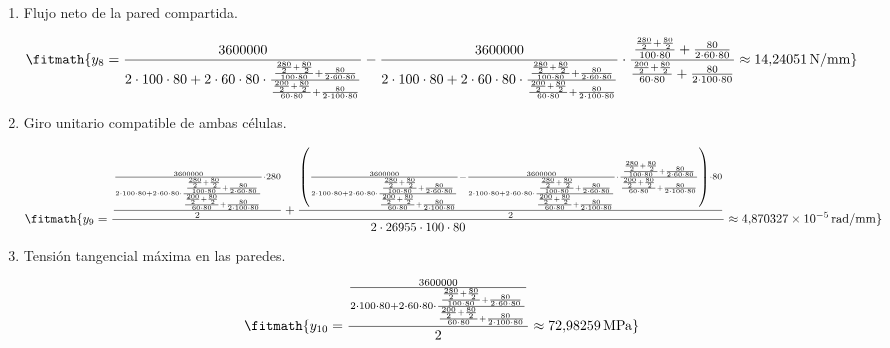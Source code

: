 \begin{enumerate}
\item Flujo neto de la pared compartida.

\[\fitmath{y_{8}=\frac{3600000}{2\cdot 100\cdot 80+2\cdot 60\cdot 80\cdot \frac{\frac{\frac{280}{2}+\frac{80}{2}}{100\cdot 80}+\frac{80}{2\cdot 60\cdot 80}}{\frac{\frac{200}{2}+\frac{80}{2}}{60\cdot 80}+\frac{80}{2\cdot 100\cdot 80}}}-\frac{3600000}{2\cdot 100\cdot 80+2\cdot 60\cdot 80\cdot \frac{\frac{\frac{280}{2}+\frac{80}{2}}{100\cdot 80}+\frac{80}{2\cdot 60\cdot 80}}{\frac{\frac{200}{2}+\frac{80}{2}}{60\cdot 80}+\frac{80}{2\cdot 100\cdot 80}}}\cdot \frac{\frac{\frac{280}{2}+\frac{80}{2}}{100\cdot 80}+\frac{80}{2\cdot 60\cdot 80}}{\frac{\frac{200}{2}+\frac{80}{2}}{60\cdot 80}+\frac{80}{2\cdot 100\cdot 80}}\approx 14{,}24051\,\mathrm{N/mm}}\]

\item Giro unitario compatible de ambas células.

\[\fitmath{y_{9}=\frac{\frac{\frac{3600000}{2\cdot 100\cdot 80+2\cdot 60\cdot 80\cdot \frac{\frac{\frac{280}{2}+\frac{80}{2}}{100\cdot 80}+\frac{80}{2\cdot 60\cdot 80}}{\frac{\frac{200}{2}+\frac{80}{2}}{60\cdot 80}+\frac{80}{2\cdot 100\cdot 80}}}\cdot 280}{2}+\frac{\left(\frac{3600000}{2\cdot 100\cdot 80+2\cdot 60\cdot 80\cdot \frac{\frac{\frac{280}{2}+\frac{80}{2}}{100\cdot 80}+\frac{80}{2\cdot 60\cdot 80}}{\frac{\frac{200}{2}+\frac{80}{2}}{60\cdot 80}+\frac{80}{2\cdot 100\cdot 80}}}-\frac{3600000}{2\cdot 100\cdot 80+2\cdot 60\cdot 80\cdot \frac{\frac{\frac{280}{2}+\frac{80}{2}}{100\cdot 80}+\frac{80}{2\cdot 60\cdot 80}}{\frac{\frac{200}{2}+\frac{80}{2}}{60\cdot 80}+\frac{80}{2\cdot 100\cdot 80}}}\cdot \frac{\frac{\frac{280}{2}+\frac{80}{2}}{100\cdot 80}+\frac{80}{2\cdot 60\cdot 80}}{\frac{\frac{200}{2}+\frac{80}{2}}{60\cdot 80}+\frac{80}{2\cdot 100\cdot 80}}\right)\cdot 80}{2}}{2\cdot 26955\cdot 100\cdot 80}\approx 4{,}870327\times10^{-5}\,\mathrm{rad/mm}}\]

\item Tensión tangencial máxima en las paredes.

\[\fitmath{y_{10}=\frac{\frac{3600000}{2\cdot 100\cdot 80+2\cdot 60\cdot 80\cdot \frac{\frac{\frac{280}{2}+\frac{80}{2}}{100\cdot 80}+\frac{80}{2\cdot 60\cdot 80}}{\frac{\frac{200}{2}+\frac{80}{2}}{60\cdot 80}+\frac{80}{2\cdot 100\cdot 80}}}}{2}\approx 72{,}98259\,\mathrm{MPa}}\]

\end{enumerate}
